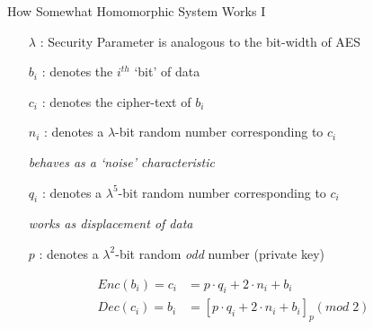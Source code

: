 \documentclass[dvips,11pt]{beamer}
\begin{document}
\begin{frame}{How Somewhat Homomorphic System Works I}
  \begin{itemize}
  \item[\(\lambda\) :] Security Parameter is analogous to the bit-width of AES
  \item[\(b_i\) :] denotes the \(i^{th}\) `bit' of data
  \item[\(c_i\) :] denotes the cipher-text of \(b_i\)
  \item[\(n_i\) :] denotes a \(\lambda\)-bit random number corresponding to \(c_i\)

    \hspace{4em} {\em behaves as a `noise' characteristic}

  \item[\(q_i\) :] denotes a \(\lambda^5\)-bit random number corresponding to \(c_i\)

    \hspace{4em} {\em works as displacement of data}
  
  \item[\(p\) :] denotes a \(\lambda^2\)-bit random {\em odd} number (private key)
    
  \end{itemize}
  \begin{align*}
  Enc(b_i) = c_i &= p\cdot q_i + 2\cdot n_i + b_i\\
  Dec(c_i) = b_i &= \left[p\cdot q_i + 2\cdot n_i + b_i\right]_p(mod\;2)
  \end{align*}
  
\end{frame}
\end{document}
